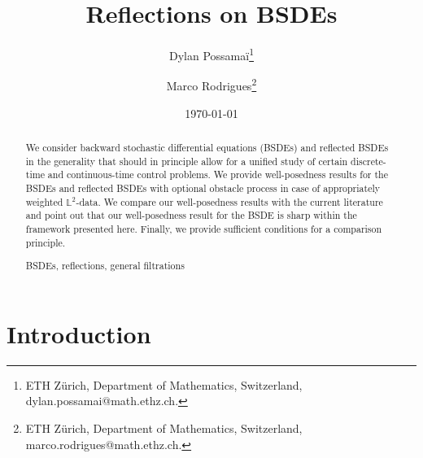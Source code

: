 \documentclass[10pt]{article} %
\def \L{\mathbb{L}}
\begin{document}
\title{Reflections on BSDEs}


\author{Dylan {\sc Possama\"{i}}\footnote{ETH Z\"urich, Department of Mathematics, Switzerland, dylan.possamai@math.ethz.ch.}\and Marco {\sc Rodrigues}\footnote{ETH Z\"urich, Department of Mathematics, Switzerland, marco.rodrigues@math.ethz.ch.}}

\date{\today}

\maketitle

\begin{abstract}

We consider backward stochastic differential equations (BSDEs) and reflected BSDEs in the generality that should in principle allow for a unified study of certain discrete-time and continuous-time control problems. We provide well-posedness results for the BSDEs and reflected BSDEs with optional obstacle process in case of appropriately weighted $\L^2$-data. We compare our well-posedness results with the current literature and point out that our well-posedness result for the BSDE is sharp within the framework presented here. Finally, we provide sufficient conditions for a comparison principle.

\vspace{5mm}
  BSDEs, reflections, general filtrations\vspace{5mm}
\end{abstract}




	
\section{Introduction}\label{sec::introduction}
\end{document}
